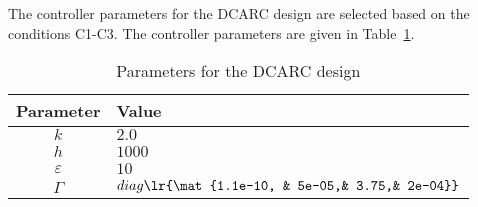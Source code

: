 
The controller parameters for the DCARC design are selected based on the
conditions C1-C3. The controller parameters are given in Table~\ref{tab::ctrl_prm}.
\begin{table}[H]
    \caption{Parameters for the DCARC design}
    \label{tab::ctrl_prm}
    \centering
    \begin{tabular}{c l}
        \hline \hline
        Parameter & Value \\
        \hline
        $k$ & $2.0$ \\
        $h$ & $1000$ \\
        $\varepsilon$ & $10$ \\
        $\Gamma$ & $diag\lr{\mat{1.1e-10, & 5e-05,& 3.75,& 2e-04}}$\\
        \hline\hline
    \end{tabular}
\end{table}
